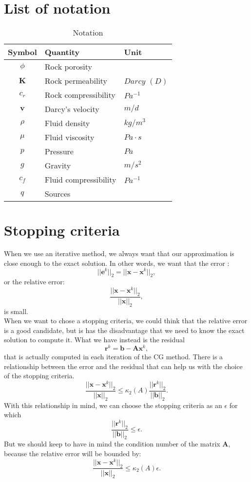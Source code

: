 \documentclass[12pt]{article}
\begin{document}
\newpage

 
 \newpage
 
% 
\newpage
\newpage
\appendix
\section{List of notation}\label{a1}


\begin{table}[!h]
\centering
\begin{tabular}{c l l }
\hline
Symbol & Quantity & Unit \\[0.5ex]
\hline
$\phi$ & Rock porosity&   \\
 $\mathbf{K}$& Rock permeability&  $Darcy$ $(D)$ \\
 $c_r$& Rock compressibility&  $Pa^{-1}$ \\
$\mathbf{v}$ & Darcy's velocity& $ m/d$ \\
$\rho$ &Fluid density &  $kg/m^3$ \\
 $\mu$&Fluid viscosity & $Pa \cdot s$   \\
${p}$  &Pressure &  $Pa$ \\
$g$  &Gravity &  $m/s^2$ \\
$c_f$ &Fluid compressibility &  $Pa^{-1}$ \\
$q$ &Sources &   \\
\hline
\end{tabular}\label{table:symbols}
\caption{Notation}
\end{table}

\newpage
\section{Stopping criteria}\label{a2}
When we use an iterative method, we always want that our approximation is close enough 
to the exact solution. In other words, we want that the error \cite[pag. 42]{Saad03}: 
$$||\mathbf{e}^k||_2=||\mathbf{x}-\mathbf{x}^k||_2,$$ or the relative error: 
$$\frac{||\mathbf{x}-\mathbf{x}^k||_2}{||\mathbf{x}||_2},$$is small. \\
When we want to chose a stopping criteria, we could think that the relative error is a
good candidate, but is has the disadvantage that we need to know the exact solution to compute it.
What we have instead is the residual $$\mathbf{r}^k=\mathbf{b}-\mathbf{A}\mathbf{x}^k,$$ 
that is actually computed in each iteration of the CG method. There is a relationship between the 
error and the residual that can help us with the choice of the stopping criteria.
$$\frac{||\mathbf{x}-\mathbf{x}^k||_2}{||\mathbf{x}||_2}\leq \kappa_2(A)\frac{||\mathbf{r}^k||_2}{||\mathbf{b}||_2}.$$
With this relationship in mind, we can choose the stopping criteria as an $\epsilon$ for which
$$ \frac{||\mathbf{r}^k||_2}{||\mathbf{b}||_2}\leq \epsilon.$$
But we should keep to have in mind the condition number of the matrix $\mathbf{A}$, because the relative error will be bounded by:
$$\frac{||\mathbf{x}-\mathbf{x}^k||_2}{||\mathbf{x}||_2}\leq \kappa_2(A) \epsilon.$$
\newpage
\end{document}
